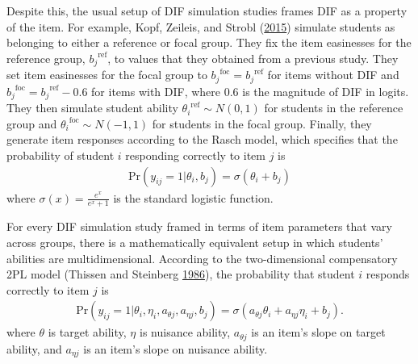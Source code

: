 \documentclass[
  11pt,
]{article}
\begin{document}
Despite this, the usual setup of DIF simulation studies frames DIF as a property of the item. For example, Kopf, Zeileis, and Strobl (\protect\hyperlink{ref-kopf2015framework}{2015}) simulate students as belonging to either a reference or focal group. They fix the item easinesses for the reference group, \({b_j}^{\text{ref}}\), to values that they obtained from a previous study. They set item easinesses for the focal group to \({b_j}^{\text{foc}} = {b_j}^{\text{ref}}\) for items without DIF and \({b_j}^{\text{foc}} = {b_j}^{\text{ref}} - 0.6\) for items with DIF, where 0.6 is the magnitude of DIF in logits. They then simulate student ability \({\theta_i}^{\text{ref}} \sim N(0,1)\) for students in the reference group and \({\theta_i}^{\text{foc}} \sim N(-1,1)\) for students in the focal group. Finally, they generate item responses according to the Rasch model, which specifies that the probability of student \(i\) responding correctly to item \(j\) is
\begin{align}
\text{Pr}(y_{ij} = 1 | \theta_i, b_j) = \sigma(\theta_i + b_j) \label{zopf}
\end{align}
where \(\sigma(x) = \frac{e^x}{e^x + 1}\) is the standard logistic function.

For every DIF simulation study framed in terms of item parameters that vary across groups, there is a mathematically equivalent setup in which students' abilities are multidimensional. According to the two-dimensional compensatory 2PL model (Thissen and Steinberg \protect\hyperlink{ref-thissen1986taxonomy}{1986}), the probability that student \(i\) responds correctly to item \(j\) is
\begin{align}
\text{Pr}(y_{ij} = 1 | \theta_i, \eta_i, a_{\theta j}, a_{\eta j}, b_j) = \sigma(a_{\theta j}\theta_i + a_{\eta j}\eta_i + b_j).
\end{align}
where \(\theta\) is target ability, \(\eta\) is nuisance ability, \(a_{\theta j}\) is an item's slope on target ability, and \(a_{\eta j}\) is an item's slope on nuisance ability.
\end{document}
